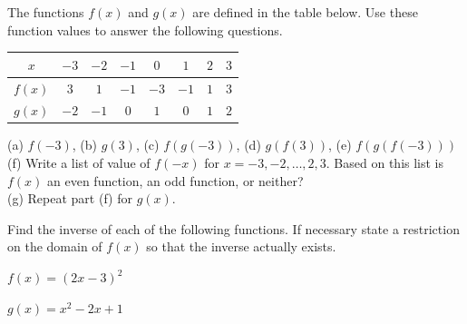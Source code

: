 \begin{exercises} 

\item The functions $f(x)$ and $g(x)$ are defined in the table below.  Use these function
    values to answer the following questions.
    \begin{center}
        \begin{tabular}[h!]{|c||c|c|c|c|c|c|c|}
            \hline
            $x$   & $-3$ &$-2$ &$-1$ &$ 0$ &$ 1$ &$ 2$ & $3$ \\ \hline \hline
            $f(x)$& $ 3$ &$ 1$ &$-1$ &$-3$ &$-1$ &$ 1$ & $3$\\ \hline
            $g(x)$& $-2$ &$-1$ &$ 0$ &$ 1$ &$ 0$ &$ 1$ & $2$\\ \hline
        \end{tabular}
    \end{center}
        (a) $f(-3)$, \quad (b) $g(3)$, \quad (c) $f(g(-3))$, \quad (d) $g(f(3))$, \quad
        (e) $f(g(f(-3)))$ \\
        (f) Write a list of value of $f(-x)$ for $x = -3, -2, \dots, 2, 3$.  Based on
            this list is $f(x)$ an even function, an odd function, or neither?\\
        (g) Repeat part (f) for $g(x)$.
\begin{exerciseSolution}
\end{exerciseSolution}


\item Find the inverse of each of the following functions.  If necessary state a
    restriction on the domain of $f(x)$ so that the inverse actually exists.
    \ba
        \item $f(x) = (2x-3)^2$
        \item $g(x) = x^2 - 2x + 1$
    \ea
\begin{exerciseSolution}
\end{exerciseSolution}



\end{exercises}
